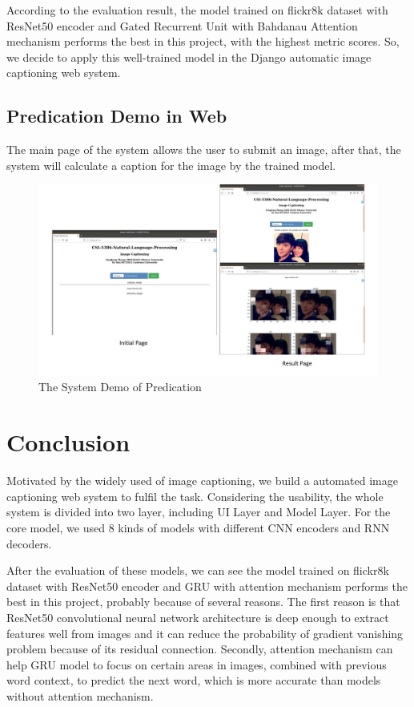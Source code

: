 \documentclass{article}
\begin{document}
According to the evaluation result, the model trained on flickr8k dataset with ResNet50 encoder and Gated Recurrent Unit with Bahdanau Attention mechanism performs the best in this project, with the highest metric scores. So, we decide to apply this well-trained model in the Django automatic image captioning web system.

\subsection{Predication Demo in Web}
The main page of the system allows the user to submit an image, after that, the system will calculate a caption for the image by the trained model.

\begin{figure}[h]
\centering
\includegraphics[width=1\textwidth]{system.jpg}
\caption{The System Demo of Predication}
\label{fig4}
\end{figure}

\section{Conclusion}
Motivated by the widely used of image captioning, we build a automated image captioning web system to fulfil the task. Considering the usability, the whole system is divided into two layer, including UI Layer and Model Layer. For the core model, we used 8 kinds of models with different CNN encoders and RNN decoders. 

After the evaluation of these models, we can see the model trained on flickr8k dataset with ResNet50 encoder and GRU with attention mechanism performs the best in this project, probably because of several reasons. The first reason is that ResNet50 convolutional neural network architecture is deep enough to extract features well from images and it can reduce the probability of gradient vanishing problem because of its residual connection. Secondly, attention mechanism can help GRU model to focus on certain areas in images, combined with previous word context, to predict the next word, which is more accurate than models without attention mechanism.
\end{document}
